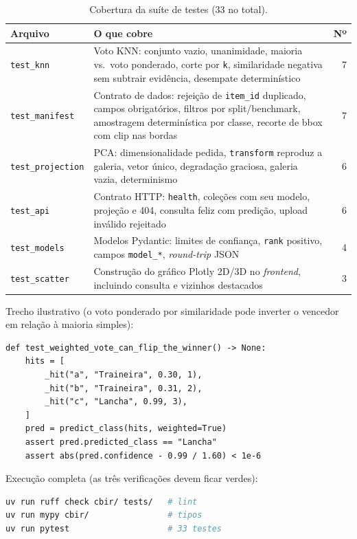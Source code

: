 \documentclass[10pt]{article}
\begin{document}
\begin{table}[H]
\centering
\begin{tabular}{@{}p{2.6cm}p{10cm}r@{}}
\toprule
\textbf{Arquivo} & \textbf{O que cobre} & \textbf{Nº} \\
\midrule
\texttt{test\_knn} & Voto KNN: conjunto vazio, unanimidade, maioria vs.\ voto ponderado, corte por \texttt{k}, similaridade negativa sem subtrair evidência, desempate determinístico & 7 \\
\texttt{test\_manifest} & Contrato de dados: rejeição de \texttt{item\_id} duplicado, campos obrigatórios, filtros por split/benchmark, amostragem determinística por classe, recorte de bbox com clip nas bordas & 7 \\
\texttt{test\_projection} & PCA: dimensionalidade pedida, \texttt{transform} reproduz a galeria, vetor único, degradação graciosa, galeria vazia, determinismo & 6 \\
\texttt{test\_api} & Contrato HTTP: \texttt{health}, coleções com seu modelo, projeção e 404, consulta feliz com predição, upload inválido rejeitado & 6 \\
\texttt{test\_models} & Modelos Pydantic: limites de confiança, \texttt{rank} positivo, campos \texttt{model\_*}, \emph{round-trip} JSON & 4 \\
\texttt{test\_scatter} & Construção do gráfico Plotly 2D/3D no \emph{frontend}, incluindo consulta e vizinhos destacados & 3 \\
\bottomrule
\end{tabular}
\caption{Cobertura da suíte de testes (33 no total).}
\end{table}

\noindent Trecho ilustrativo (o voto ponderado por similaridade pode inverter o
vencedor em relação à maioria simples):

\begin{lstlisting}
def test_weighted_vote_can_flip_the_winner() -> None:
    hits = [
        _hit("a", "Traineira", 0.30, 1),
        _hit("b", "Traineira", 0.31, 2),
        _hit("c", "Lancha", 0.99, 3),
    ]
    pred = predict_class(hits, weighted=True)
    assert pred.predicted_class == "Lancha"
    assert abs(pred.confidence - 0.99 / 1.60) < 1e-6
\end{lstlisting}

\noindent Execução completa (as três verificações devem ficar verdes):

\begin{lstlisting}[language=bash]
uv run ruff check cbir/ tests/   # lint
uv run mypy cbir/                # tipos
uv run pytest                    # 33 testes
\end{lstlisting}
\end{document}
